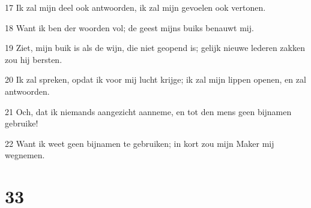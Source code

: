 \par 17 Ik zal mijn deel ook antwoorden, ik zal mijn gevoelen ook vertonen.
\par 18 Want ik ben der woorden vol; de geest mijns buiks benauwt mij.
\par 19 Ziet, mijn buik is als de wijn, die niet geopend is; gelijk nieuwe lederen zakken zou hij bersten.
\par 20 Ik zal spreken, opdat ik voor mij lucht krijge; ik zal mijn lippen openen, en zal antwoorden.
\par 21 Och, dat ik niemands aangezicht aanneme, en tot den mens geen bijnamen gebruike!
\par 22 Want ik weet geen bijnamen te gebruiken; in kort zou mijn Maker mij wegnemen.

\chapter{33}

